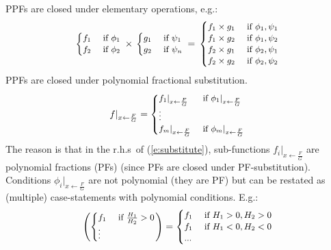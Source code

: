 \documentclass[]{article}
\newcommand{\case}[2]{#2 &\text{ if } #1}%
\begin{document}

PPFs are closed under elementary operations, e.g.:
\begin{equation*}
\footnotesize
  \begin{cases}
  \case{\phi_1}{f_1}\\
  \case{\phi_2}{f_2}    
  \end{cases}
\,
 \times
\,
  \begin{cases}
  \case{\psi_1}{g_1} \\
  \case{\psi_n}{g_2} 
  \end{cases}
 \, = \,
\begin{cases}
  \case{\phi_1, \psi_1}{f_1 \times g_1} \\ 
  \case{\phi_1, \psi_2}{f_1 \times g_2} \\
  \case{\phi_2, \psi_1}{f_2 \times g_1} \\
  \case{\phi_2, \psi_2}{f_2 \times g_2}
  \end{cases}
\end{equation*} 
%
PPFs are closed under polynomial fractional substitution.%
\begin{equation}
\label{e:substitute}
\footnotesize
f|_{x \leftarrow \frac{F}{G}}
=
\begin{cases}
  \case{{\phi_1}|_{x \leftarrow \frac{F}{G}}}{{f_1}|_{x \leftarrow \frac{F}{G}}}\\
\vdots\\
  \case{{\phi_m}|_{x \leftarrow \frac{F}{G}}}{{f_m}|_{x \leftarrow \frac{F}{G}}}    
  \end{cases}
\end{equation}
The reason is that in the r.h.s\ of (\ref{e:substitute}), 
sub-functions $f_i |_{x \leftarrow \frac{F}{G}}$ are polynomial fractions (PFs) 
(since PFs are closed under PF-substitution).
Conditions ${\phi_i}|_{x \leftarrow \frac{F}{G}}$ are not polynomial (they are PF) %
but can be restated as (multiple) case-statements with polynomial conditions. E.g.:
\begin{equation*} \footnotesize
\left(
 \begin{cases}
  \case{\frac{H_1}{H_2} > 0}{f_1} \\
   \vdots
 \end{cases} 
\right)
 =
{\footnotesize
\begin{cases}
  \case{H_1 > 0, H_2 > 0 }{f_1} \\ 
  \case{H_1 < 0, H_2 < 0}{f_1} \\ 
  ...
 \end{cases} 
}
\end{equation*}
\end{document}
